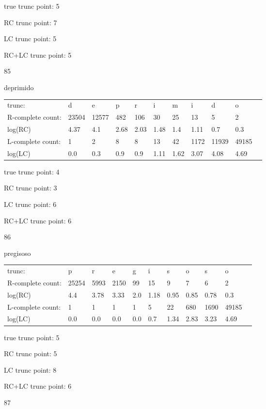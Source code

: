 \documentclass{article}
\begin{document}
true trunc point: 5

RC trunc point: 7

LC trunc point: 5

RC+LC trunc point: 5

\newpage

85

deprimido

\begin{tabular}{l|llllllllll}
trunc: & d & e & p & r & i & m & i & d & o & \\ 
R-complete count: & 23504 & 12577 & 482 & 106 & 30 & 25 & 13 & 5 & 2 & \\ 
log(RC) & 4.37 & 4.1 & 2.68 & 2.03 & 1.48 & 1.4 & 1.11 & 0.7 & 0.3 & \\ 
L-complete count: & 1 & 2 & 8 & 8 & 13 & 42 & 1172 & 11939 & 49185 & \\ 
log(LC) & 0.0 & 0.3 & 0.9 & 0.9 & 1.11 & 1.62 & 3.07 & 4.08 & 4.69 & \\ 
\end{tabular}

true trunc point: 4

RC trunc point: 3

LC trunc point: 6

RC+LC trunc point: 6

\vspace{1em}

86

pregisoso

\begin{tabular}{l|llllllllll}
trunc: & p & r & e & g & i & s & o & s & o & \\ 
R-complete count: & 25254 & 5993 & 2150 & 99 & 15 & 9 & 7 & 6 & 2 & \\ 
log(RC) & 4.4 & 3.78 & 3.33 & 2.0 & 1.18 & 0.95 & 0.85 & 0.78 & 0.3 & \\ 
L-complete count: & 1 & 1 & 1 & 1 & 5 & 22 & 680 & 1690 & 49185 & \\ 
log(LC) & 0.0 & 0.0 & 0.0 & 0.0 & 0.7 & 1.34 & 2.83 & 3.23 & 4.69 & \\ 
\end{tabular}

true trunc point: 5

RC trunc point: 5

LC trunc point: 8

RC+LC trunc point: 6

\vspace{1em}

87
\end{document}
